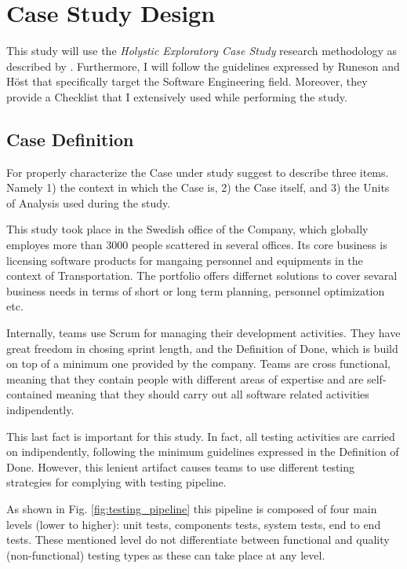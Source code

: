 \chapter{Case Study Design} \label{methods}
This study will use the \textit{Holystic Exploratory Case Study} research methodology as described by \cite{case_study_guide}. Furthermore, I will follow the guidelines expressed by Runeson and H{\"o}st \cite{case_study_software_engineering} that specifically target the Software Engineering field. Moreover, they provide a Checklist that I extensively used while performing the study.



%
%
%
%
\section{Case Definition}	\label{case-description}
For properly characterize the Case under study \cite{case_study_guide} suggest to describe three items. Namely 1) the context in which the Case is, 2) the Case itself, and 3) the Units of Analysis used during the study.

This study took place in the Swedish office of the Company, which globally employes more than 3000 people scattered in several offices. Its core business is licensing software products for mangaing personnel and equipments in the context of Transportation. The portfolio offers differnet solutions to cover sevaral business needs in terms of short or long term planning, personnel optimization etc.

Internally, teams use Scrum for managing their development activities. They have great freedom in chosing sprint length, and the Definition of Done, which is build on top of a minimum one provided by the company. Teams are cross functional, meaning that they contain people with different areas of expertise and are self-contained meaning that they should carry out all software related activities indipendently.

This last fact is important for this study. In fact, all testing activities are carried on indipendently, following the minimum guidelines expressed in the Definition of Done. However, this lenient artifact causes teams to use different testing strategies for complying with testing pipeline. 

As shown in Fig. \ref{fig:testing_pipeline} this pipeline is composed of four main levels (lower to higher): unit tests, components tests, system tests, end to end tests. These mentioned level do not differentiate between functional and quality (non-functional) testing types as these can take place at any level. 

